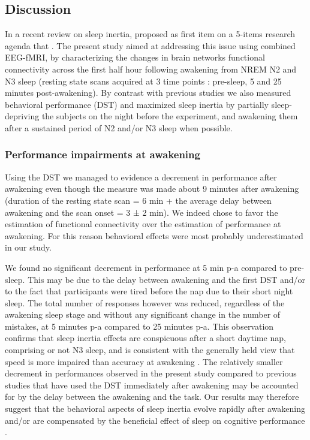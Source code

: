 \FloatBarrier

\subsection*{Discussion}
\label{res:inertia:inertia:discussion}

In a recent review on sleep inertia, \citet{trotti_waking_2016} proposed as first item on a 5-items research agenda that . The present study aimed at addressing this issue using combined EEG-fMRI, by characterizing the changes in brain networks functional connectivity across the first half hour following awakening from NREM N2 and N3 sleep (resting state scans acquired at 3 time points : pre-sleep, 5 and 25 minutes post-awakening). By contrast with previous studies we also measured behavioral performance (DST) and maximized sleep inertia by partially sleep-depriving the subjects on the night before the experiment, and awakening them after a sustained period of N2 and/or N3 sleep when possible.

\subsubsection*{Performance impairments at awakening}
Using the DST we managed to evidence a decrement in performance after awakening even though the measure was made about 9 minutes after awakening (duration of the resting state scan = 6 min + the average delay between awakening and the scan onset = 3 ± 2 min). We indeed chose to favor the estimation of functional connectivity over the estimation of performance at awakening. For this reason behavioral effects were most probably underestimated in our study.

We found no significant decrement in performance at 5 min p-a compared to pre-sleep. This may be due to the delay between awakening and the first DST and/or to the fact that participants were tired before the nap due to their short night sleep. The total number of responses however was reduced, regardless of the awakening sleep stage and without any significant change in the number of mistakes, at 5 minutes p-a compared to 25 minutes p-a. This observation confirms that sleep inertia effects are conspicuous after a short daytime nap, comprising or not N3 sleep, and is consistent with the generally held view that speed is more impaired than accuracy at awakening \citep{tassi_sleep_2000, trotti_waking_2016}. The relatively smaller decrement in performances observed in the present study compared to previous studies that have used the DST immediately after awakening \citep{dinges_assessing_1985, evans_recovery_1975, stampi_ultrashort_1990} may be accounted for by the delay between the awakening and the task. Our results may therefore suggest that the behavioral aspects of sleep inertia evolve rapidly after awakening and/or are compensated by the beneficial effect of sleep on cognitive performance \citep{faraut_napping:_2016}.


